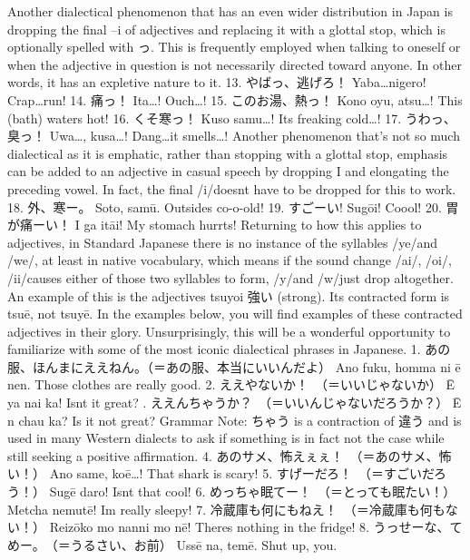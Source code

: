 \hfill\break
\hfill\break
Another dialectical phenomenon that has an even wider distribution in Japan is dropping the final –i of adjectives and replacing it with a glottal stop, which is optionally spelled with っ. This is frequently employed when talking to oneself or when the adjective in question is not necessarily directed toward anyone. In other words, it has an expletive nature to it. 13. やばっ、逃げろ！ Yaba…nigero! Crap…run! 14. 痛っ！ Ita…! Ouch…! 15. このお湯、熱っ！ Kono oyu, atsu…! This (bath) water\textquotesingle s hot! 16. くそ寒っ！ Kuso samu…! It\textquotesingle s freaking cold…! 17. うわっ、臭っ！ Uwa…, kusa…! Dang…it smells…! Another phenomenon that's not so much dialectical as it is emphatic, rather than stopping with a glottal stop, emphasis can be added to an adjective in casual speech by dropping I and elongating the preceding vowel. In fact, the final \slash i\slash  doesn\textquotesingle t have to be dropped for this to work. 18. 外、寒ー。 Soto, samū. Outside\textquotesingle s co-o-old! 19. すごーい! Sugōi! Coool! 20. 胃が痛ーい！ I ga itāi! My stomach hurrts! Returning to how this applies to adjectives, in Standard Japanese there is no instance of the syllables \slash ye\slash  and \slash we\slash , at least in native vocabulary, which means if the sound change \slash ai\slash , \slash oi\slash , \slash ii\slash  \textrightarrow  [ē] causes either of those two syllables to form, \slash y\slash  and \slash w\slash  just drop altogether. An example of this is the adjectives tsuyoi 強い (strong). Its contracted form is tsuē, not tsuyē. In the examples below, you will find examples of these contracted adjectives in their glory. Unsurprisingly, this will be a wonderful opportunity to familiarize with some of the most iconic dialectical phrases in Japanese. 1. あの服、ほんまにええねん。（＝あの服、本当にいいんだよ） Ano fuku, homma ni ē nen. Those clothes are really good. 2. ええやないか！　（＝いいじゃないか） Ē ya nai ka! Isn\textquotesingle t it great? \hfill{}. ええんちゃうか？　（＝いいんじゃないだろうか？） Ē n chau ka? Is it not great? Grammar Note: ちゃう is a contraction of 違う and is used in many Western dialects to ask if something is in fact not the case while still seeking a positive affirmation. 4. あのサメ、怖えぇぇ！　（＝あのサメ、怖い！） Ano same, koē…! That shark is scary! 5. すげーだろ！　（＝すごいだろう！） Sugē daro! Isn\textquotesingle t that cool! 6. めっちゃ眠てー！　（＝とっても眠たい！） Metcha nemutē! I\textquotesingle m really sleepy! 7. 冷蔵庫も何にもねえ！　（＝冷蔵庫も何もない！） Reizōko mo nan\textquotesingle ni mo nē! There\textquotesingle s nothing in the fridge! 8. うっせーな、てめー。　（＝うるさい、お前） Ussē na, temē. Shut up, you. \hfill\break
